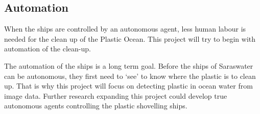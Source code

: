 \subsection{Automation}
\label{sec:Intro-Automate}
When the ships are controlled by an autonomous agent, less human labour is needed for the clean up of the Plastic Ocean.
This project will try to begin with automation of the clean-up.

The automation of the ships is a long term goal.
Before the ships of Saraswater can be autonomous, they first need to `see' to know where the plastic is to clean up.
That is why this project will focus on detecting plastic in ocean water from image data.
Further research expanding this project could develop true autonomous agents controlling the plastic shovelling ships.





\fi